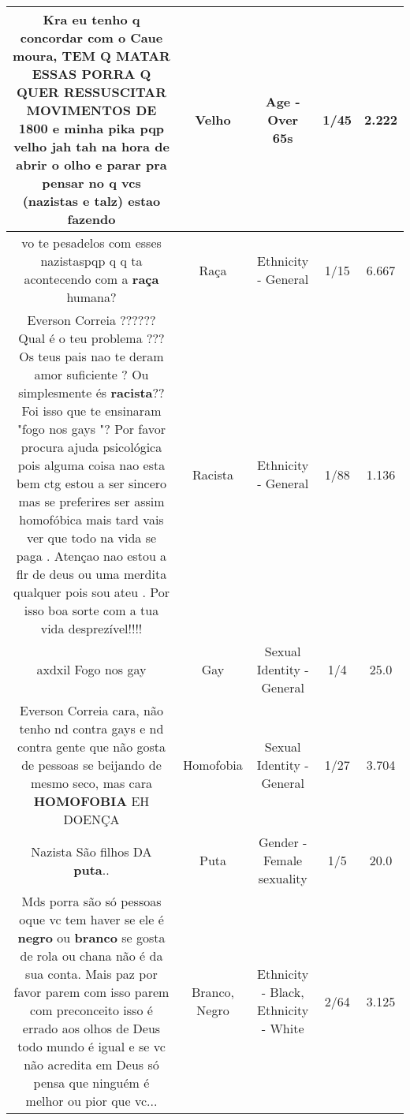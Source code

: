 \documentclass[11pt]{article}
\newlength\mylength
\begin{document}
\begin{center}
\begin{longtable}{|C{.65\mylength}|C{.30\mylength}|C{.12\mylength}|C{.12\mylength}|C{.12\mylength}|}
  \small Kra eu tenho q concordar com o Caue moura, TEM Q MATAR ESSAS PORRA Q QUER RESSUSCITAR MOVIMENTOS DE 1800 e minha pika pqp \textbf{velho} jah tah na hora de abrir o olho e parar pra pensar no q vcs (nazistas e talz) estao fazendo\normalsize   & Velho & Age - Over 65s & 1/45 & 2.222 \\  \hline
  \small vo te pesadelos com esses nazistaspqp q q ta acontecendo com a \textbf{raça} humana?\normalsize   & Raça & Ethnicity - General & 1/15 & 6.667 \\  \hline
  \small Everson Correia ?????? Qual é o teu problema ??? Os teus pais nao te deram amor suficiente ? Ou simplesmente és \textbf{racista}?? Foi isso que te ensinaram "fogo nos gays "? Por favor procura ajuda psicológica pois alguma coisa nao esta bem ctg estou a ser sincero  mas se preferires ser assim homofóbica mais tard vais ver que todo na vida se  paga . Atençao nao estou a flr de deus ou uma merdita qualquer pois sou ateu . Por isso boa sorte com a tua vida desprezível!!!!\normalsize   & Racista & Ethnicity - General & 1/88 & 1.136 \\  \hline
  \small axdxil Fogo nos gay\normalsize   & Gay & Sexual Identity - General & 1/4 & 25.0 \\  \hline
  \small Everson Correia cara, não tenho nd contra gays e nd contra gente que não gosta de pessoas se beijando de mesmo seco, mas cara \textbf{HOMOFOBIA} EH DOENÇA\normalsize   & Homofobia & Sexual Identity - General & 1/27 & 3.704 \\  \hline
  \small Nazista São filhos DA \textbf{puta}..\normalsize   & Puta & Gender - Female sexuality & 1/5 & 20.0 \\  \hline
  \small Mds porra são só pessoas oque vc tem haver se ele é \textbf{negro} ou \textbf{branco} se gosta de rola ou chana não é da sua conta. Mais paz por favor parem com isso parem com preconceito isso é errado aos olhos de Deus todo mundo é igual e se vc não acredita em Deus só pensa que ninguém é melhor ou pior que vc...\normalsize   & Branco, Negro & Ethnicity - Black, Ethnicity - White & 2/64 & 3.125 \\  \hline

\end{longtable}
\end{center}
\end{document}
